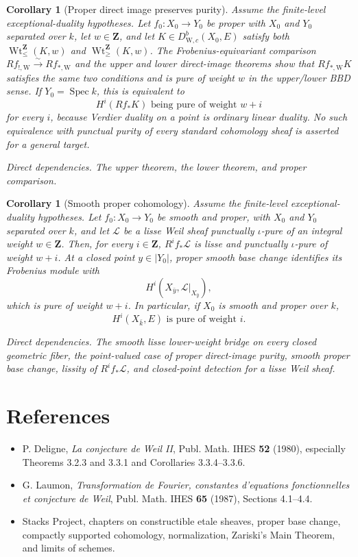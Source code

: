 \documentclass[10pt]{article}
\newtheorem{corollary}[theorem]{Corollary}
\theoremstyle{definition}
\newcommand{\DW}{D^b_{\mathrm W,c}}
\newcommand{\IntWtLe}{\operatorname{Wt}^{\mathbf Z}_{\leq}}
\newcommand{\IntWtGe}{\operatorname{Wt}^{\mathbf Z}_{\geq}}
\newcommand{\Spec}{\operatorname{Spec}}
\newcommand{\dep}[1]{\par\smallskip\noindent\textit{Direct dependencies.} #1\par}
\begin{document}
\begin{corollary}[Proper direct image preserves purity]
Assume the finite-level exceptional-duality hypotheses.  Let
\(f_0:X_0\to Y_0\) be proper with \(X_0\) and \(Y_0\) separated over
\(k\), let \(w\in\mathbf Z\), and let \(K\in\DW(X_0,E)\) satisfy both
\(\IntWtLe(K,w)\) and \(\IntWtGe(K,w)\).  The Frobenius-equivariant
comparison \(Rf_{!,\mathrm W}\xrightarrow{\sim}Rf_{*,\mathrm W}\) and the
upper and lower direct-image theorems show that
\(Rf_{*,\mathrm W}K\) satisfies the same two conditions and is pure of weight
\(w\) in the upper/lower BBD sense.  If
\(Y_0=\Spec k\), this is equivalent to
\[
                 H^i(Rf_*K)\text{ being pure of weight }w+i
\]
for every \(i\), because Verdier duality on a point is ordinary linear
duality.  No such equivalence with punctual purity of every standard
cohomology sheaf is asserted for a general target.
\dep{The upper theorem, the lower theorem, and proper comparison.}
\end{corollary}

\begin{corollary}[Smooth proper cohomology]
Assume the finite-level exceptional-duality hypotheses.  Let
\(f_0:X_0\to Y_0\) be smooth and proper, with \(X_0\) and \(Y_0\)
separated over \(k\), and let \(\mathcal L\) be a
lisse Weil sheaf punctually \(\iota\)-pure of an integral weight
\(w\in\mathbf Z\).  Then, for every \(i\in\mathbf Z\),
\(R^if_*\mathcal L\) is lisse and punctually \(\iota\)-pure of weight
\(w+i\).  At a closed point
\(y\in|Y_0|\), proper smooth base change identifies its Frobenius module with
\[
 H^i(X_{\bar y},\mathcal L|_{X_{\bar y}}),
\]
which is pure of weight \(w+i\).  In particular, if \(X_0\) is smooth and
proper over \(k\),
\[
                    H^i(X_{\bar k},E)
       \text{ is pure of weight }i.
\]
\dep{The smooth lisse lower-weight bridge on every closed geometric fiber,
the point-valued case of proper direct-image purity, smooth proper base
change, lissity of \(R^if_*\mathcal L\), and closed-point detection for a
lisse Weil sheaf.}
\end{corollary}

\section{References}

\begin{itemize}
\item P. Deligne, \emph{La conjecture de Weil II}, Publ. Math. IHES
      \textbf{52} (1980), especially Theorems 3.2.3 and 3.3.1 and
      Corollaries 3.3.4--3.3.6.
\item G. Laumon, \emph{Transformation de Fourier, constantes d'equations
      fonctionnelles et conjecture de Weil}, Publ. Math. IHES
      \textbf{65} (1987), Sections 4.1--4.4.
\item Stacks Project, chapters on constructible etale sheaves, proper base
      change, compactly supported cohomology, normalization, Zariski's Main
      Theorem, and limits of schemes.
\end{itemize}
\end{document}
